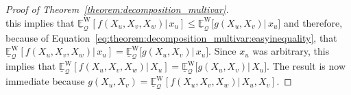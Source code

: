 \documentclass[10pt,a4paper]{paper}
\theoremstyle{definition}
\newcommand{\states}{\mathcal{X}}
\newcommand{\processes}{\mathbb{P}}
\newcommand{\wprocesses}{\processes^{\mathrm{W}}}
\newcommand{\rateset}{\mathcal{Q}}
\newcommand{\abs}[1]{\left\vert #1 \right\vert}
\newcommand{\coloneqq}{:\!=}
\begin{document}
\begin{proof}[Proof of Theorem~\ref{theorem:decomposition_multivar}]
\begin{equation*}
\end{equation*}
this implies that
$\underline{\mathbb{E}}^{\mathrm{W}}_\rateset\left[f(X_u,X_v,X_w)\vert\,x_u\right]\leq\underline{\mathbb{E}}^{\mathrm{W}}_\rateset\bigl[g(X_u,X_v)\big\vert\,x_u\bigr]$ and therefore, because of Equation~\eqref{eq:theorem:decomposition_multivar:easyinequality}, that $\underline{\mathbb{E}}^{\mathrm{W}}_\rateset\left[f(X_u,X_v,X_w)\vert\,x_u\right]=\underline{\mathbb{E}}^{\mathrm{W}}_\rateset\bigl[g(X_u,X_v)\big\vert\,x_u\bigr]$. Since $x_u$ was arbitrary, this implies that $\underline{\mathbb{E}}^{\mathrm{W}}_\rateset\left[f(X_u,X_v,X_w)\vert\,X_u\right]=\underline{\mathbb{E}}^{\mathrm{W}}_\rateset\bigl[g(X_u,X_v)\big\vert\,X_u\bigr]$. The result is now immediate because $g(X_u,X_v)=\underline{\mathbb{E}}^{\mathrm{W}}_\rateset\left[f(X_u,X_v,X_w)\vert\,X_u,X_v\right]$. 

\end{proof}
\end{document}
